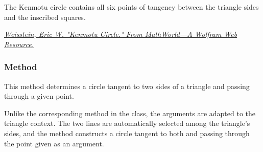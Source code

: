 The Kenmotu circle contains all six points of tangency between the triangle sides and the inscribed squares.

\begin{flushright}
\href{https://mathworld.wolfram.com/KenmotuCircle.html}
{\textit{Weisstein, Eric W. "Kenmotu Circle." From MathWorld—A Wolfram Web Resource.}}
\end{flushright}

\vspace{1em}


\begin{tkzexample}[latex=6cm]
\begin{center}
\end{center}
\end{tkzexample}



\subsubsection{Method } %
\label{ssub:method_triangle_c_ll_p}

This method determines a circle tangent to two sides of a triangle and passing through a given point.

Unlike the corresponding method in the  class, the arguments are adapted to the triangle context. The two lines are automatically selected among the triangle’s sides, and the method constructs a circle tangent to both and passing through the point given as an argument.

